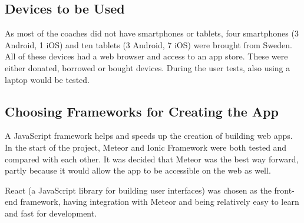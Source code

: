 \subsection{Devices to be Used}
As most of the coaches did not have smartphones or tablets, four smartphones (3 Android, 1 iOS) and ten tablets (3 Android, 7 iOS) were brought from Sweden. All of these devices had a web browser and access to an app store. These were either donated, borrowed or bought devices. During the user tests, also using a laptop would be tested.


\subsection{Choosing Frameworks for Creating the App}

A JavaScript framework helps and speeds up the creation of building web apps. In the start of the project, Meteor \citep{meteor} and Ionic Framework \citep{ionic} were both tested and compared with each other. It was decided that Meteor was the best way forward, partly because it would allow the app to be accessible on the web as well. %

React \citep{react} (a JavaScript library for building user interfaces) was chosen as the front-end framework, having integration with Meteor and being relatively easy to learn and fast for development.
